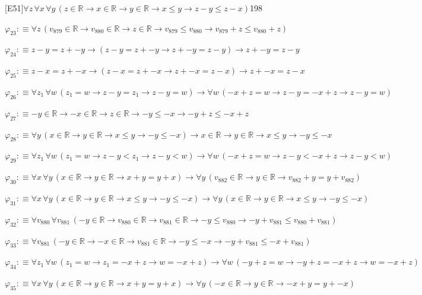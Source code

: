 \begin{fullproof}{[E51]}{$\forall z\,\forall x\,\forall y\,(z \in \mathbb{R} \to x \in \mathbb{R} \to y \in \mathbb{R} \to x \leq y \to z - y \leq z - x)$}{198}
\begin{abbrevlist}
\item $\varphi_{23} :\equiv \forall z\,(v_{879} \in \mathbb{R} \to v_{880} \in \mathbb{R} \to z \in \mathbb{R} \to v_{879} \leq v_{880} \to v_{879} + z \leq v_{880} + z)$
\item $\varphi_{24} :\equiv z - y = z + -y \to (z - y = z + -y \to z + -y = z - y) \to z + -y = z - y$
\item $\varphi_{25} :\equiv z - x = z + -x \to (z - x = z + -x \to z + -x = z - x) \to z + -x = z - x$
\item $\varphi_{26} :\equiv \forall z_{1}\,\forall w\,(z_{1} = w \to z - y = z_{1} \to z - y = w) \to \forall w\,(-x + z = w \to z - y = -x + z \to z - y = w)$
\item $\varphi_{27} :\equiv -y \in \mathbb{R} \to -x \in \mathbb{R} \to z \in \mathbb{R} \to -y \leq -x \to -y + z \leq -x + z$
\item $\varphi_{28} :\equiv \forall y\,(x \in \mathbb{R} \to y \in \mathbb{R} \to x \leq y \to -y \leq -x) \to x \in \mathbb{R} \to y \in \mathbb{R} \to x \leq y \to -y \leq -x$
\item $\varphi_{29} :\equiv \forall z_{1}\,\forall w\,(z_{1} = w \to z - y < z_{1} \to z - y < w) \to \forall w\,(-x + z = w \to z - y < -x + z \to z - y < w)$
\item $\varphi_{30} :\equiv \forall x\,\forall y\,(x \in \mathbb{R} \to y \in \mathbb{R} \to x + y = y + x) \to \forall y\,(v_{882} \in \mathbb{R} \to y \in \mathbb{R} \to v_{882} + y = y + v_{882})$
\item $\varphi_{31} :\equiv \forall x\,\forall y\,(x \in \mathbb{R} \to y \in \mathbb{R} \to x \leq y \to -y \leq -x) \to \forall y\,(x \in \mathbb{R} \to y \in \mathbb{R} \to x \leq y \to -y \leq -x)$
\item $\varphi_{32} :\equiv \forall v_{880}\,\forall v_{881}\,(-y \in \mathbb{R} \to v_{880} \in \mathbb{R} \to v_{881} \in \mathbb{R} \to -y \leq v_{880} \to -y + v_{881} \leq v_{880} + v_{881})$
\item $\varphi_{33} :\equiv \forall v_{881}\,(-y \in \mathbb{R} \to -x \in \mathbb{R} \to v_{881} \in \mathbb{R} \to -y \leq -x \to -y + v_{881} \leq -x + v_{881})$
\item $\varphi_{34} :\equiv \forall z_{1}\,\forall w\,(z_{1} = w \to z_{1} = -x + z \to w = -x + z) \to \forall w\,(-y + z = w \to -y + z = -x + z \to w = -x + z)$
\item $\varphi_{35} :\equiv \forall x\,\forall y\,(x \in \mathbb{R} \to y \in \mathbb{R} \to x + y = y + x) \to \forall y\,(-x \in \mathbb{R} \to y \in \mathbb{R} \to -x + y = y + -x)$

\end{abbrevlist}
\end{fullproof}
